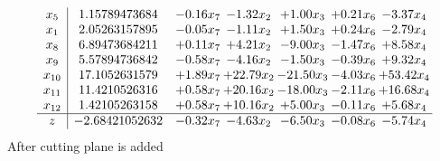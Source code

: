 \documentclass[8pt]{article}
\begin{document}
\[\begin{array}{c| c c@{\hskip 2pt} c@{\hskip 2pt} c@{\hskip 2pt} c@{\hskip 2pt} c@{\hskip 2pt} }
 x_{5}   &  1.15789473684 & -0.16 x_{7} & -1.32 x_{2} & +  1.00 x_{3} & +  0.21 x_{6} & -3.37 x_{4}\\
 x_{1}   &  2.05263157895 & -0.05 x_{7} & -1.11 x_{2} & +  1.50 x_{3} & +  0.24 x_{6} & -2.79 x_{4}\\
 x_{8}   &  6.89473684211 & +  0.11 x_{7} & +  4.21 x_{2} & -9.00 x_{3} & -1.47 x_{6} & +  8.58 x_{4}\\
 x_{9}   &  5.57894736842 & -0.58 x_{7} & -4.16 x_{2} & -1.50 x_{3} & -0.39 x_{6} & +  9.32 x_{4}\\
 x_{10}   &  17.1052631579 & +  1.89 x_{7} & + 22.79 x_{2} & -21.50 x_{3} & -4.03 x_{6} & + 53.42 x_{4}\\
 x_{11}   &  11.4210526316 & +  0.58 x_{7} & + 20.16 x_{2} & -18.00 x_{3} & -2.11 x_{6} & + 16.68 x_{4}\\
 x_{12}   &  1.42105263158 & +  0.58 x_{7} & + 10.16 x_{2} & +  5.00 x_{3} & -0.11 x_{6} & +  5.68 x_{4}\\
\hline
z    &  -2.68421052632 & -0.32 x_{7} & -4.63 x_{2} & -6.50 x_{3} & -0.08 x_{6} & -5.74 x_{4}\\
\end{array}\]
 After cutting plane is added 
\end{document}
